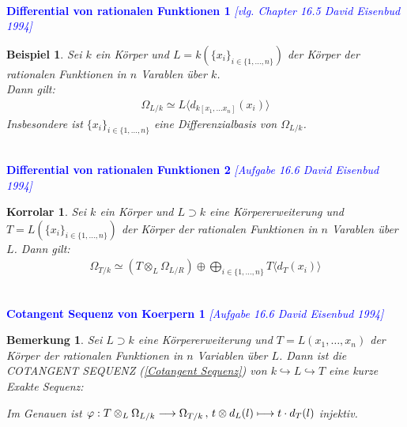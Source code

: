 \documentclass[10pt,a4paper]{report}
\newcommand{\ModulsOfDifferenzials}{David Eisenbud 1994}
\newcounter{Aussage}[chapter]
\newtheorem{korrolar}[Aussage]{Korrolar}
\newtheorem{bem}[Aussage]{Bemerkung}
\newtheorem{bsp}[Aussage]{Beispiel}
\newcommand{\function}[5]{\nolinebreak{#1:#2 \longrightarrow #3 \, , \, #4 \longmapsto #5}}
\newcommand{\divR}[2]{\Omega_{#1/#2}}
\newcommand{\divf}[1]{d_{#1}}
\newcommand{\Tensor}[3]{#1 \otimes_{#2} #3}
\newcommand{\tensor}[3]{#1 \otimes #3}
\newcommand{\Verz}[1]{\langle #1 \rangle}
\begin{document}
\ \\
\textcolor{blue}{\textbf{Differential von rationalen Funktionen 1} \textit{[vlg. Chapter 16.5 \ModulsOfDifferenzials]}}
\begin{bsp}\label{Differential von rationalen Funktionen 1}
Sei $k$ ein Körper und $L = k(\lbrace x_i \rbrace_{i \in \lbrace 1,\dots,n \rbrace})$ der Körper der rationalen Funktionen in $n$ Varablen über $k$.\\
Dann gilt:
\begin{gather*}
\divR{L}{k} \simeq L \Verz{\divf{k[x_1,\dots x_n]}(x_i)}
\end{gather*}
Insbesondere ist $\lbrace x_i \rbrace_{i \in \lbrace 1,\dots,n \rbrace}$ eine Differenzialbasis von $\divR{L}{k}$.
\end{bsp}


\ \\
\textcolor{blue}{\textbf{Differential von rationalen Funktionen 2} \textit{[Aufgabe 16.6 \ModulsOfDifferenzials]}}
\begin{korrolar}\label{Differential von rationalen Funktionen 2}
Sei $k$ ein Körper und $L \supset k$ eine Körpererweiterung und $T = L(\lbrace x_i \rbrace_{i \in \lbrace 1,\dots,n \rbrace})$ der Körper der rationalen Funktionen in $n$ Varablen über $L$. Dann gilt:
\begin{gather*}
\divR{T}{k} \simeq (\Tensor{T}{L}{\divR{L}{R}}) \oplus \bigoplus_{i \in \lbrace 1,\dots,n \rbrace} T \Verz{\divf{T}(x_i)}
\end{gather*}
\end{korrolar}


\ \\
\textcolor{blue}{\textbf{Cotangent Sequenz von Koerpern 1} \textit{[Aufgabe 16.6 \ModulsOfDifferenzials]}}
\begin{bem}\label{Cotangent Sequenz von Koerpern 1}
Sei $L \supset k$ eine Körpererweiterung und $T = L(x_1, \dots ,x_n)$ der Körper der rationalen Funktionen in $n$ Variablen über $L$. Dann ist die COTANGENT SEQUENZ \textit{(\cref{Cotangent Sequenz})} von $k \hookrightarrow L \hookrightarrow T$ eine kurze Exakte Sequenz:
\begin{center}
\end{center}
Im Genauen ist $\function{\varphi}{\Tensor{T}{L}{\divR{L}{k}}}{\divR{T}{k}}{\tensor{t}{L}{\divf{L}(l)}}{t \cdot \divf{T}(l)}$ injektiv.
\end{bem}
\end{document}
